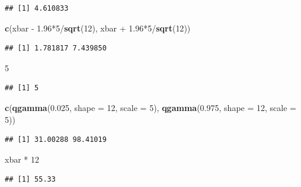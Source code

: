 \documentclass[]{book}
\newenvironment{Shaded}{\begin{snugshade}}{\end{snugshade}}
\newcommand{\KeywordTok}[1]{\textcolor[rgb]{0.13,0.29,0.53}{\textbf{{#1}}}}
\newcommand{\DataTypeTok}[1]{\textcolor[rgb]{0.13,0.29,0.53}{{#1}}}
\newcommand{\DecValTok}[1]{\textcolor[rgb]{0.00,0.00,0.81}{{#1}}}
\newcommand{\FloatTok}[1]{\textcolor[rgb]{0.00,0.00,0.81}{{#1}}}
\newcommand{\StringTok}[1]{\textcolor[rgb]{0.31,0.60,0.02}{{#1}}}
\newcommand{\NormalTok}[1]{{#1}}
\begin{document}
\begin{verbatim}
## [1] 4.610833
\end{verbatim}

\begin{Shaded}
\begin{Highlighting}[]
\KeywordTok{c}\NormalTok{(xbar -}\StringTok{ }\FloatTok{1.96}\NormalTok{*}\DecValTok{5}\NormalTok{/}\KeywordTok{sqrt}\NormalTok{(}\DecValTok{12}\NormalTok{), xbar +}\StringTok{ }\FloatTok{1.96}\NormalTok{*}\DecValTok{5}\NormalTok{/}\KeywordTok{sqrt}\NormalTok{(}\DecValTok{12}\NormalTok{))}
\end{Highlighting}
\end{Shaded}

\begin{verbatim}
## [1] 1.781817 7.439850
\end{verbatim}

\begin{Shaded}
\begin{Highlighting}[]
\DecValTok{5}
\end{Highlighting}
\end{Shaded}

\begin{verbatim}
## [1] 5
\end{verbatim}

\begin{Shaded}
\begin{Highlighting}[]
\KeywordTok{c}\NormalTok{(}\KeywordTok{qgamma}\NormalTok{(}\FloatTok{0.025}\NormalTok{, }\DataTypeTok{shape =} \DecValTok{12}\NormalTok{, }\DataTypeTok{scale =} \DecValTok{5}\NormalTok{), }\KeywordTok{qgamma}\NormalTok{(}\FloatTok{0.975}\NormalTok{, }\DataTypeTok{shape =} \DecValTok{12}\NormalTok{, }\DataTypeTok{scale =} \DecValTok{5}\NormalTok{))}
\end{Highlighting}
\end{Shaded}

\begin{verbatim}
## [1] 31.00288 98.41019
\end{verbatim}

\begin{Shaded}
\begin{Highlighting}[]
\NormalTok{xbar *}\StringTok{ }\DecValTok{12}
\end{Highlighting}
\end{Shaded}

\begin{verbatim}
## [1] 55.33
\end{verbatim}
\end{document}
